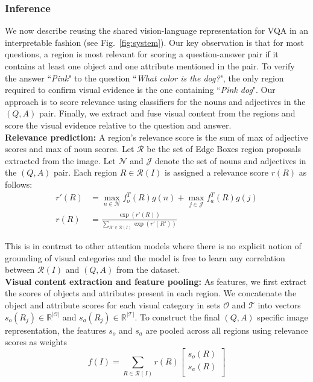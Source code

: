 \documentclass[10pt,twocolumn,letterpaper]{article}
\begin{document}
\subsubsection{Inference} \label{sec:vqa_inference}
We now describe reusing the shared vision-language representation for VQA in an interpretable fashion (see Fig.~\ref{fig:system}). Our key observation is that for most questions, a region is most relevant for scoring a question-answer pair if it contains at least one object and one attribute mentioned in the pair. To verify the answer ``\textit{Pink}" to the question ``\textit{What color is the dog?}", the only region required to confirm visual evidence is the one containing ``\textit{Pink dog}". Our approach is to score relevance using classifiers for the nouns and adjectives in the $(Q,A)$ pair. Finally, we extract and fuse visual content from the regions and score the visual evidence relative to the question and answer.\\

\noindent
\textbf{Relevance prediction:}\label{sec:relevance} A region's relevance score is the sum of max of adjective scores and max of noun scores. Let $\mathcal{R}$ be the set of Edge Boxes \cite{zitnick2014edge} region proposals extracted from the image. Let $\mathcal{N}$ and $\mathcal{J}$ denote the set of nouns and adjectives in the $(Q,A)$ pair. Each region $R\in \mathcal{R}(I)$ is assigned a relevance score $r(R)$ as follows:
\begin{align}
r'(R) &= \max_{n \in \mathcal{N}} f_o^T(R)g(n) + \max_{j \in \mathcal{J}} f_a^T(R)g(j) \\
r(R)&= \frac{\exp(r'(R))}{\sum_{R' \in \mathcal{R}(I)}\exp(r'(R'))}
\label{eqn:relevance}
\end{align}

This is in contrast to other attention models \cite{yang2015stacked,lu2016hierarchical} where there is no explicit notion of grounding of visual categories and the model is free to learn any correlation between $\mathcal{R}(I)$ and $(Q,A)$ from the dataset.\\

\noindent
\textbf{Visual content extraction and feature pooling:} As features, we first extract the scores of objects and attributes present in each region. We concatenate the object and attribute scores for each visual category in sets $\mathcal{O}$ and $\mathcal{T}$ into vectors $s_o(R_j) \in \mathbb{R}^{|\mathcal{O}|}$ and $s_a(R_j) \in \mathbb{R}^{|\mathcal{T}|}$. To construct the final $(Q,A)$ specific image representation, the features $s_o$ and $s_a$ are pooled across all regions using relevance scores as weights
\begin{equation}
f(I) = \sum_{R\in\mathcal{R}(I)}r(R)
\begin{bmatrix}
s_o(R) \\
s_a(R) \\
\end{bmatrix}
\label{eqn:weightedvisualfeats}
\end{equation}
\end{document}
